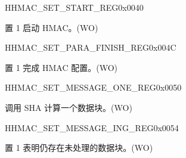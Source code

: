 \begin{register}{H}{HMAC\_SET\_START\_REG}{0x0040}\label{regdesc:HMACSETSTARTREG}
%
%
\regnewline%
\begin{regdesc}\begin{reglist}
\label{fielddesc:HMACSETSTART}\item [HMAC\_SET\_START] 置 1 启动 HMAC。(WO)
\end{reglist}\end{regdesc}
\end{register}


\begin{register}{H}{HMAC\_SET\_PARA\_FINISH\_REG}{0x004C}\label{regdesc:HMACSETPARAFINISHREG}
%
%
\regnewline%
\begin{regdesc}\begin{reglist}
\label{fielddesc:HMACSETPARAEND}\item [HMAC\_SET\_PARA\_END] 置 1 完成 HMAC 配置。(WO)
\end{reglist}\end{regdesc}
\end{register}


\begin{register}{H}{HMAC\_SET\_MESSAGE\_ONE\_REG}{0x0050}\label{regdesc:HMACSETMESSAGEONEREG}
%
%
\regnewline%
\begin{regdesc}\begin{reglist}
\label{fielddesc:HMACSETTEXTONE}\item [HMAC\_SET\_TEXT\_ONE] 调用 SHA 计算一个数据块。(WO)
\end{reglist}\end{regdesc}
\end{register}


\begin{register}{H}{HMAC\_SET\_MESSAGE\_ING\_REG}{0x0054}\label{regdesc:HMACSETMESSAGEINGREG}
%
%
\regnewline%
\begin{regdesc}\begin{reglist}
\label{fielddesc:HMACSETTEXTING}\item [HMAC\_SET\_TEXT\_ING] 置 1 表明仍存在未处理的数据块。(WO)
\end{reglist}\end{regdesc}
\end{register}


